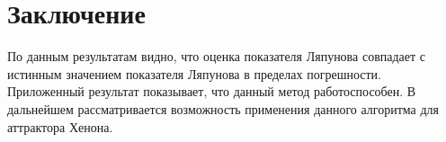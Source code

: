 \documentclass[a4paper]{article}
\begin{document}
\section{Заключение}

По данным результатам видно, что оценка показателя Ляпунова совпадает с истинным значением показателя Ляпунова в пределах погрешности. Приложенный результат показывает, что данный метод работоспособен. В дальнейшем рассматривается возможность применения данного алгоритма для аттрактора Хенона. 
\end{document}
